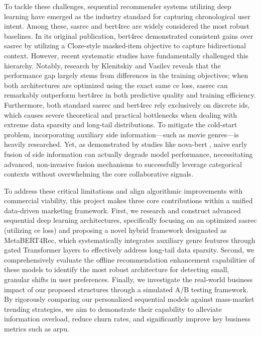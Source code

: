 \documentclass[conference]{IEEEtran}
\begin{document}
To tackle these challenges, sequential recommender systems utilizing deep learning have emerged as the industry standard for capturing chronological user intent. Among these, \gls{sasrec} \cite{b1} and \gls{bert4rec} \cite{b2} are widely considered the most robust baselines. In its original publication, \gls{bert4rec} demonstrated consistent gains over \gls{sasrec} by utilizing a Cloze-style masked-item objective to capture bidirectional context. However, recent systematic studies have fundamentally challenged this hierarchy. Notably, research by Klenitskiy and Vasilev \cite{b3} reveals that the performance gap largely stems from differences in the training objectives; when both architectures are optimized using the exact same \gls{ce} loss, \gls{sasrec} can remarkably outperform \gls{bert4rec} in both predictive quality and training efficiency. Furthermore, both standard \gls{sasrec} and \gls{bert4rec} rely exclusively on discrete \glspl{id}, which causes severe theoretical and practical bottlenecks when dealing with extreme data sparsity and long-tail distributions. To mitigate the cold-start problem, incorporating auxiliary side information—such as movie genres—is heavily researched. Yet, as demonstrated by studies like \gls{nova-bert} \cite{b4}, naive early fusion of side information can actually degrade model performance, necessitating advanced, non-invasive fusion mechanisms to successfully leverage categorical contexts without overwhelming the core collaborative signals.

To address these critical limitations and align algorithmic improvements with commercial viability, this project makes three core contributions within a unified data-driven marketing framework. First, we research and construct advanced sequential deep learning architectures, specifically focusing on an optimized \gls{sasrec} (utilizing \gls{ce} loss) and proposing a novel hybrid framework designated as MetaBERT4Rec, which systematically integrates auxiliary genre features through gated Transformer layers to effectively address long-tail data sparsity. Second, we comprehensively evaluate the offline recommendation enhancement capabilities of these models to identify the most robust architecture for detecting small, granular shifts in user preferences. Finally, we investigate the real-world business impact of our proposed structures through a simulated A/B testing framework. By rigorously comparing our personalized sequential models against mass-market trending strategies, we aim to demonstrate their capability to alleviate information overload, reduce churn rates, and significantly improve key business metrics such as \gls{arpu}.
\end{document}
